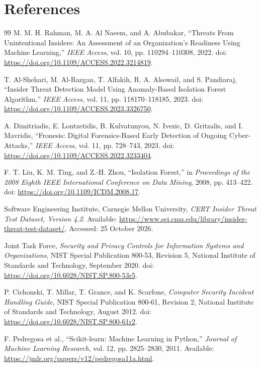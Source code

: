 \chapter{References}
\label{chap:references}
\begin{thebibliography}{99}
M. M. H. Rahman, M. A. Al Naeem, and A. Abubakar,
``Threats From Unintentional Insiders: An Assessment of an
Organization's Readiness Using Machine Learning,''
\emph{IEEE Access}, vol. 10, pp. 110294--110308, 2022.
doi: \url{https://doi.org/10.1109/ACCESS.2022.3214819}.

T. Al-Shehari, M. Al-Razgan, T. Alfakih, R. A. Alsowail, and
S. Pandiaraj, ``Insider Threat Detection Model Using Anomaly-Based
Isolation Forest Algorithm,'' \emph{IEEE Access}, vol. 11,
pp. 118170--118185, 2023.
doi: \url{https://doi.org/10.1109/ACCESS.2023.3326750}.

A. Dimitriadis, E. Lontzetidis, B. Kulvatunyou, N. Ivezic,
D. Gritzalis, and I. Mavridis, ``Fronesis: Digital Forensics-Based
Early Detection of Ongoing Cyber-Attacks,'' \emph{IEEE Access},
vol. 11, pp. 728--743, 2023.
doi: \url{https://doi.org/10.1109/ACCESS.2022.3233404}.

F. T. Liu, K. M. Ting, and Z.-H. Zhou, ``Isolation Forest,'' in
\emph{Proceedings of the 2008 Eighth IEEE International Conference on
Data Mining}, 2008, pp. 413--422.
doi: \url{https://doi.org/10.1109/ICDM.2008.17}.

Software Engineering Institute, Carnegie Mellon University,
\emph{CERT Insider Threat Test Dataset, Version 4.2}.
Available: \url{https://www.sei.cmu.edu/library/insider-threat-test-dataset/}.
Accessed: 25 October 2026.

Joint Task Force,
\emph{Security and Privacy Controls for Information Systems and Organizations},
NIST Special Publication 800-53, Revision 5, National Institute of
Standards and Technology, September 2020.
doi: \url{https://doi.org/10.6028/NIST.SP.800-53r5}.

P. Cichonski, T. Millar, T. Grance, and K. Scarfone,
\emph{Computer Security Incident Handling Guide},
NIST Special Publication 800-61, Revision 2, National Institute of
Standards and Technology, August 2012.
doi: \url{https://doi.org/10.6028/NIST.SP.800-61r2}.

F. Pedregosa et al.,
``Scikit-learn: Machine Learning in Python,''
\emph{Journal of Machine Learning Research}, vol. 12, pp. 2825--2830,
2011. Available: \url{https://jmlr.org/papers/v12/pedregosa11a.html}.


\end{thebibliography}

